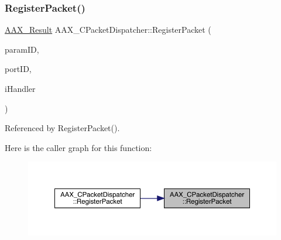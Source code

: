 \mbox{\label{a01529_a1848f0bfa473b54e9ee8e32872c89cb1}} 
\subsubsection{\texorpdfstring{RegisterPacket()}{RegisterPacket()}\hspace{0.1cm}{\footnotesize\ttfamily [1/3]}}
{\footnotesize\ttfamily \mbox{\hyperlink{a00392_a4d8f69a697df7f70c3a8e9b8ee130d2f}{A\+A\+X\+\_\+\+Result}} A\+A\+X\+\_\+\+C\+Packet\+Dispatcher\+::\+Register\+Packet (\begin{DoxyParamCaption}\item[{\mbox{\hyperlink{a00392_a1440c756fe5cb158b78193b2fc1780d1}{A\+A\+X\+\_\+\+C\+Param\+ID}}}]{param\+ID,  }\item[{\mbox{\hyperlink{a00392_ae807f8986143820cfb5d6da32165c9c7}{A\+A\+X\+\_\+\+C\+Field\+Index}}}]{port\+ID,  }\item[{const \mbox{\hyperlink{a01521}{A\+A\+X\+\_\+\+I\+Packet\+Handler}} $\ast$}]{i\+Handler }\end{DoxyParamCaption})}



Referenced by Register\+Packet().

Here is the caller graph for this function\+:
\nopagebreak
\begin{figure}[H]
\begin{center}
\leavevmode
\includegraphics[width=350pt]{a01529_a1848f0bfa473b54e9ee8e32872c89cb1_icgraph}
\end{center}
\end{figure}
\mbox{\label{a01529_af83ca953818597116ef11a345eef2e36}} 
